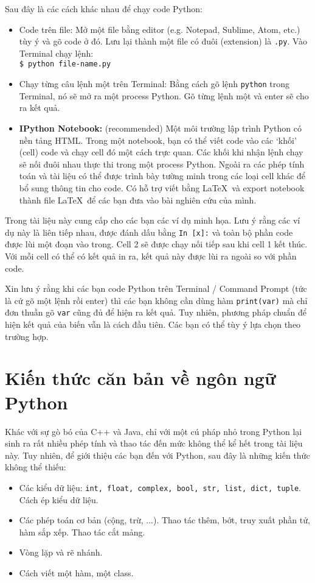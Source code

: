 \documentclass[12pt, a4paper, twoside]{article}
\begin{document}
Sau đây là các cách khác nhau để chạy code Python:
\begin{itemize}
    \item Code trên file: Mở một file bằng editor (e.g. Notepad, Sublime, Atom, etc.) tùy ý và gõ code ở đó. Lưu lại thành một file có đuôi (extension) là \texttt{.py}. Vào Terminal chạy lệnh:\\
    \texttt{\$ python file-name.py}
    \item Chạy từng câu lệnh một trên Terminal: Bằng cách gõ lệnh \texttt{python} trong Terminal, nó sẽ mở ra một process Python. Gõ từng lệnh một và enter sẽ cho ra kết quả.
    \item \textbf{IPython Notebook:} (recommended) Một môi trường lập trình Python có nền tảng HTML. Trong một notebook, bạn có thể viết code vào các `khối' (cell) code và chạy cell đó một cách trực quan. Các khối khi nhận lệnh chạy sẽ nối đuôi nhau thực thi trong một process Python. Ngoài ra các phép tính toán và tài liệu có thể được trình bày tường minh trong các loại cell khác để bổ sung thông tin cho code. Có hỗ trợ viết bằng \LaTeX\ và export notebook thành file \LaTeX\ để các bạn đưa vào bài nghiên cứu của mình.
\end{itemize}
Trong tài liệu này cung cấp cho các bạn các ví dụ minh họa. Lưu ý rằng các ví dụ này là liên tiếp nhau, được đánh dấu bằng \texttt{In [x]:} và toàn bộ phần code được lùi một đoạn vào trong. Cell 2 sẽ được chạy nối tiếp sau khi cell 1 kết thúc. Với mỗi cell có thể có kết quả in ra, kết quả này được lùi ra ngoài so với phần code.

Xin lưu ý rằng khi các bạn code Python trên Terminal / Command Prompt (tức là cứ gõ một lệnh rồi enter) thì các bạn không cần dùng hàm \texttt{print(var)} mà chỉ đơn thuần gõ \texttt{var} cũng đủ để hiện ra kết quả. Tuy nhiên, phương pháp chuẩn để hiện kết quả của biến vẫn là cách đầu tiên. Các bạn có thể tùy ý lựa chọn theo trường hợp.
\section{Kiến thức căn bản về ngôn ngữ Python}
Khác với sự gò bó của C++ và Java, chỉ với một cú pháp nhỏ trong Python lại sinh ra rất nhiều phép tính và thao tác đến mức không thể kể hết trong tài liệu này. Tuy nhiên, để giới thiệu các bạn đến với Python, sau đây là những kiến thức không thể thiếu:
\begin{itemize}
    \item Các kiểu dữ liệu: \texttt{int, float, complex, bool, str, list, dict, tuple}. Cách ép kiểu dữ liệu.
    \item Các phép toán cơ bản (cộng, trừ, ...). Thao tác thêm, bớt, truy xuất phần tử, hàm sắp xếp. Thao tác cắt mảng.
    \item Vòng lặp và rẽ nhánh.
    \item Cách viết một hàm, một class.
\end{itemize}
\end{document}
